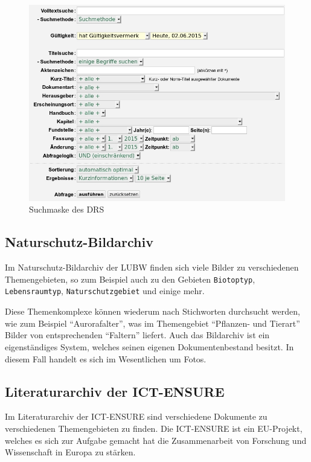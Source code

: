 \begin{figure}[!ht]
\centering
\includegraphics[width=15cm]{Bilder/Suchmaske_DRS.jpg}
\caption{Suchmaske des \ac{DRS}}
\label{Suchmaske DRS}
\centering
\end{figure}

\subsection{Naturschutz-Bildarchiv} \label{Bilddatenbank}
Im Naturschutz-Bildarchiv der \ac{LUBW} finden sich viele Bilder zu verschiedenen Themengebieten, so zum Beispiel auch zu den Gebieten \texttt{Biotoptyp}, \texttt{Lebensraumtyp}, \texttt{Naturschutzgebiet} und einige mehr.
\cite{Naturschutz-Bildarchiv}

Diese Themenkomplexe k\"onnen wiederum nach Stichworten durchsucht werden, wie zum Beispiel "`Aurorafalter"', was im Themengebiet "`Pflanzen- und Tierart"' Bilder von entsprechenden "`Faltern"' liefert. Auch das Bildarchiv ist ein eigenst\"andiges System, welches seinen eigenen Dokumentenbestand besitzt. In diesem Fall handelt es sich im Wesentlichen um Fotos.

\subsection{Literaturarchiv der ICT-ENSURE}
Im Literaturarchiv der \ac{ICT-ENSURE} sind verschiedene Dokumente zu verschiedenen Themengebieten zu finden. Die \ac{ICT-ENSURE} ist ein EU-Projekt, welches es sich zur Aufgabe gemacht hat die Zusammenarbeit von Forschung und Wissenschaft in Europa zu st\"arken.

